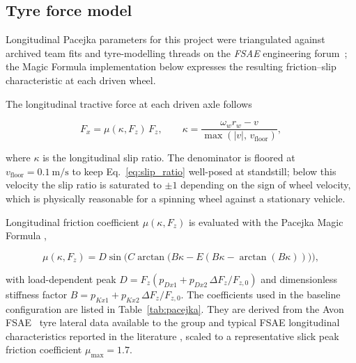\subsection{Tyre force model}
\label{sec:tyre}

\noindent
Longitudinal Pacejka parameters for this project were triangulated against archived team fits and tyre-modelling threads on the \emph{FSAE} engineering forum~\cite{fsae_engineering_forum}; the Magic Formula implementation below expresses the resulting friction--slip characteristic at each driven wheel.

The longitudinal tractive force at each driven axle follows

\begin{equation}
F_x = \mu(\kappa, F_z)\, F_z,
\qquad
\kappa = \frac{\omega_w r_w - v}{\max(|v|,\, v_\text{floor})},
\label{eq:slip_ratio}
\end{equation}

where $\kappa$ is the longitudinal slip ratio. The denominator is
floored at $v_\text{floor} = \SI{0.1}{\metre\per\second}$ to keep
Eq.~\ref{eq:slip_ratio} well-posed at standstill; below this velocity
the slip ratio is saturated to $\pm 1$ depending on the sign of
wheel velocity, which is physically reasonable for a spinning wheel
against a stationary vehicle.

Longitudinal friction coefficient $\mu(\kappa, F_z)$ is evaluated with
the Pacejka Magic Formula \cite{pacejka2012},

\begin{equation}
\mu(\kappa, F_z) = D \sin\!\Big( C \arctan\!\big( B\kappa - E(B\kappa - \arctan(B\kappa)) \big) \Big),
\label{eq:pacejka}
\end{equation}

with load-dependent peak $D = F_z (p_{Dx1} + p_{Dx2}\,\Delta F_z /
F_{z,0})$ and dimensionless stiffness factor $B = p_{Kx1} +
p_{Kx2}\,\Delta F_z / F_{z,0}$.
The coefficients used in the baseline configuration are listed in
Table~\ref{tab:pacejka}. They are derived from the Avon FSAE~\cite{fsae_engineering_forum} tyre
lateral data available to the group and typical FSAE longitudinal
characteristics reported in the literature \cite{milliken1995,
pacejka2012}, scaled to a representative slick peak friction coefficient
$\mu_\text{max} = 1.7$.

